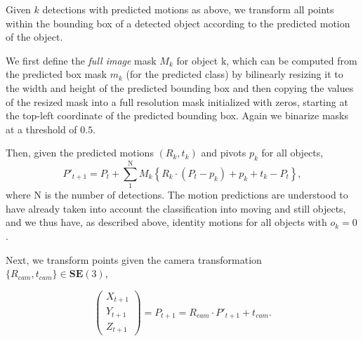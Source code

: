 Given $k$ detections with predicted motions as above, we transform all points within the bounding
box of a detected object according to the predicted motion of the object.

We first define the \emph{full image} mask $M_k$ for object k,
which can be computed from the predicted box mask $m_k$ (for the predicted class) by bilinearly resizing
it to the width and height of the predicted bounding box and then copying the values
of the resized mask into a full resolution mask initialized with zeros,
starting at the top-left coordinate of the predicted bounding box.
Again we binarize masks at a threshold of $0.5$.

Then, given the predicted motions $(R_k, t_k)$ and pivots $p_k$ for all objects,
\begin{equation}
P'_{t+1} =
P_t + \sum_1^{\text{N}} M_k\left\{ R_k \cdot (P_t - p_k) + p_k + t_k - P_t \right\},
\end{equation}
where N is the number of detections.
The motion predictions are understood to have already taken into account
the classification into moving and still objects,
and we thus have, as described above, identity motions for all objects with $o_k = 0$.

Next, we transform points given the camera transformation $\{R_{cam}, t_{cam}\} \in \mathbf{SE}(3)$,

\begin{equation}
\begin{pmatrix}
X_{t+1} \\ Y_{t+1} \\ Z_{t+1}
\end{pmatrix}
= P_{t+1} = R_{cam} \cdot P'_{t+1} + t_{cam}.
\end{equation}


